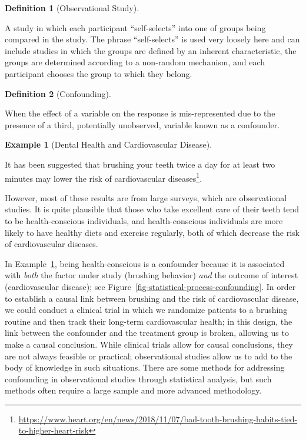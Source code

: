 \documentclass[
  letterpaper,
  DIV=11,
  numbers=noendperiod]{scrreprt}
\theoremstyle{definition}
\newtheorem{example}{Example}[chapter]
\theoremstyle{definition}
\newtheorem{definition}{Definition}[chapter]
\theoremstyle{remark}
\begin{document}
\begin{definition}[Observational
Study]\protect\hypertarget{def-observational-study}{}\label{def-observational-study}

A study in which each participant ``self-selects'' into one of groups
being compared in the study. The phrase ``self-selects'' is used very
loosely here and can include studies in which the groups are defined by
an inherent characteristic, the groups are determined according to a
non-random mechanism, and each participant chooses the group to which
they belong.

\end{definition}

\begin{definition}[Confounding]\protect\hypertarget{def-confounding}{}\label{def-confounding}

When the effect of a variable on the response is mis-represented due to
the presence of a third, potentially unobserved, variable known as a
confounder.

\end{definition}

\begin{example}[Dental Health and Cardiovascular
Disease]\protect\hypertarget{exm-dental-health}{}\label{exm-dental-health}

It has been suggested that brushing your teeth twice a day for at least
two minutes may lower the risk of cardiovascular diseases\footnote{\url{https://www.heart.org/en/news/2018/11/07/bad-tooth-brushing-habits-tied-to-higher-heart-risk}}.

However, most of these results are from large surveys, which are
observational studies. It is quite plausible that those who take
excellent care of their teeth tend to be health-conscious individuals,
and health-conscious individuals are more likely to have healthy diets
and exercise regularly, both of which decrease the risk of
cardiovascular diseases.

\end{example}

In Example~\ref{exm-dental-health}, being health-conscious is a
confounder because it is associated with \emph{both} the factor under
study (brushing behavior) \emph{and} the outcome of interest
(cardiovascular disease); see
Figure~\ref{fig-statistical-process-confounding}. In order to establish
a causal link between brushing and the risk of cardiovascular disease,
we could conduct a clinical trial in which we randomize patients to a
brushing routine and then track their long-term cardiovascular health;
in this design, the link between the confounder and the treatment group
is broken, allowing us to make a causal conclusion. While clinical
trials allow for causal conclusions, they are not always feasible or
practical; observational studies allow us to add to the body of
knowledge in such situations. There are some methods for addressing
confounding in observational studies through statistical analysis, but
such methods often require a large sample and more advanced methodology.
\end{document}
